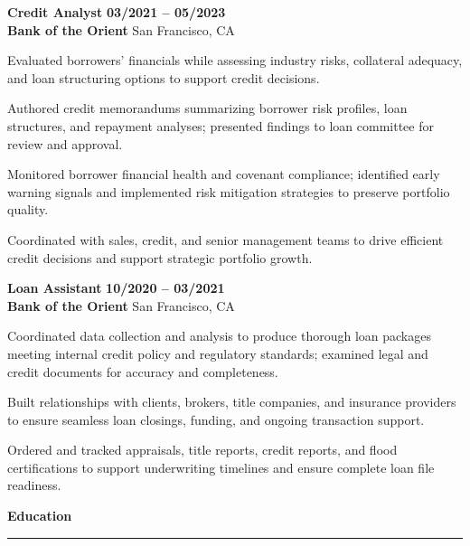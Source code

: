 \documentclass[letterpaper,11pt]{article}
\renewcommand{\section}[1]{%
  \vspace{5pt}%
  {\large\bfseries\color{sectionblue}#1}\\[-6pt]%
  {\color{sectionblue}\rule{\textwidth}{0.8pt}}%
  \vspace{1pt}%
}
\renewenvironment{itemize}{%
  \begin{list}{\textbullet}{%
    \setlength{\leftmargin}{1.5em}%
    \setlength{\itemsep}{1pt}%
    \setlength{\parsep}{0pt}%
    \setlength{\topsep}{1pt}%
    \setlength{\partopsep}{0pt}%
  }%
}{\end{list}}
\begin{document}
\vspace{1pt}

\textbf{Credit Analyst} \hfill \textbf{03/2021 -- 05/2023}\\
\textbf{Bank of the Orient} \hfill San Francisco, CA
\begin{itemize}
  \item Evaluated borrowers' financials while assessing industry risks, collateral adequacy, and loan structuring options to support credit decisions.
  \item Authored credit memorandums summarizing borrower risk profiles, loan structures, and repayment analyses; presented findings to loan committee for review and approval.
  \item Monitored borrower financial health and covenant compliance; identified early warning signals and implemented risk mitigation strategies to preserve portfolio quality.
  \item Coordinated with sales, credit, and senior management teams to drive efficient credit decisions and support strategic portfolio growth.
\end{itemize}

\vspace{1pt}

\textbf{Loan Assistant} \hfill \textbf{10/2020 -- 03/2021}\\
\textbf{Bank of the Orient} \hfill San Francisco, CA
\begin{itemize}
  \item Coordinated data collection and analysis to produce thorough loan packages meeting internal credit policy and regulatory standards; examined legal and credit documents for accuracy and completeness.
  \item Built relationships with clients, brokers, title companies, and insurance providers to ensure seamless loan closings, funding, and ongoing transaction support.
  \item Ordered and tracked appraisals, title reports, credit reports, and flood certifications to support underwriting timelines and ensure complete loan file readiness.
\end{itemize}

\section{Education}
\end{document}
